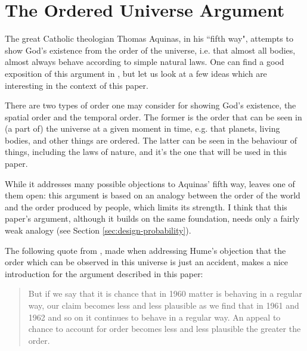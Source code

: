 \documentclass[a4paper
,draft
]{article}
\newcommand{\paper}[1]{paper}
\newcommand{\ghilimele}[1]{``#1"}
\begin{document}
\section{The Ordered Universe Argument}
\label{sec:ordered-universe}

The great Catholic theologian Thomas Aquinas,
in his \ghilimele{fifth way}, attempts to show God's existence from
the order of the universe, i.e. that almost all bodies, almost always
behave according to simple natural laws.
One can find a good exposition of this argument in
\parencite{swinburne1968}, but let us look at a few ideas which are
interesting in the context of this \paper{}.

There are two types of order one may consider for showing God's existence,
the spatial order and the temporal order.
The former is the order that can be seen in (a part of) the universe
at a given moment in time, e.g. that planets, living bodies, and other things
are ordered.
The latter can be seen in the behaviour of things, including the laws of
nature, and it's the one that will be used in this \paper{}.

While it addresses many possible objections to Aquinas' fifth way,
 leaves one of them open:
this argument is based on an analogy between the order of the world and the order
produced by people, which limits its strength.
I think that this \paper{}'s argument, although it builds on the same
foundation, needs only a fairly weak analogy
(see Section \ref{sec:design-probability}).

The following quote from \textcite{swinburne1968}, made when addressing
Hume's objection that the order which can be observed in this universe
is just an accident, makes a nice introduction for the argument
described in this \paper{}:
\begin{quote}
But if we say that it is chance that in 1960 matter is behaving in a
regular way, our claim becomes less and less plausible as we find that in
1961 and 1962 and so on it continues to behave in a regular way. An appeal
to chance to account for order becomes less and less plausible
the greater the order.
\end{quote}
\end{document}
